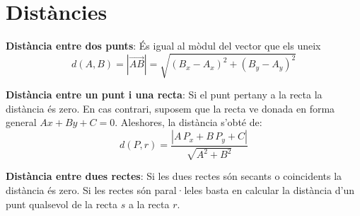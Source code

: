 \documentclass[11pt, a4paper, pdf]{article}
\begin{document}
\begin{comment}
\begin{mylist}
	 
	\item  Siguin les rectes $r\equiv \left\{\begin{array}{l} {x=2+\lambda } \\ {y=1-2\lambda } \end{array}\right. $ i $s\equiv 2x+y=2$. Estudia la seva posició relativa i calcula els seus punts de tall si els hi hagués.
	
	
	\item  Siguin les rectes $r\equiv \left(1,\; 1\right)+\lambda \left(-1,\; 2\right)$ i $s\equiv x+y=3$. Estudia la seva posició relativa i calcula els seus punts de tall si els hi hagués.
	
	\item  Siguin les rectes $r\equiv \left(0,\; -2\right)+\lambda \, \left(1,\; 4\right)$ i $s\equiv 4x-y-2=0$. Estudia la seva posició relativa i calcula els seus punts de tall si els hi hagués. 
\end{mylist}	
\end{comment}


\section{Distàncies}
\begin{theorybox}
	\textbf{Distància entre dos punts}: És igual al mòdul del vector que els uneix 
	\begin{equation*}
	d(A,B)=|\overrightarrow{AB}|=\sqrt{(B_x-A_x)^2 + (B_y-A_y)^2}
	\end{equation*}
	
	\textbf{Distància entre un punt i una recta}: Si el punt pertany a la recta la distància és zero. En cas contrari, suposem que la recta ve donada en forma general $Ax+By+C=0$. Aleshores, la distància s'obté de:
	\begin{equation*}
	d(P,r)=\frac{|A\,P_x+B\,P_y+C|}{\sqrt{A^2+B^2}} 
	\end{equation*}
	
	\textbf{Distància entre dues rectes}: Si les dues rectes són secants o coincidents la distància és zero. Si les rectes són paral·leles basta en calcular la distància d'un punt qualsevol de la recta $s$ a la recta $r$.
\end{theorybox}
\end{document}
